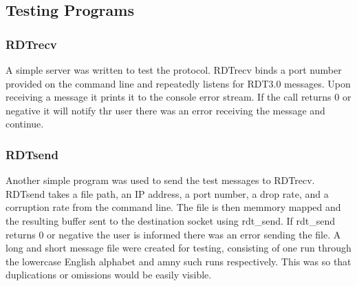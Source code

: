 \documentclass[11pt]{article}
\begin{document}
\subsection{Testing Programs}
\subsubsection{RDTrecv}
A simple server was written to test the protocol.  RDTrecv binds a port number provided on the command line and repeatedly listens for RDT3.0 messages.  Upon receiving a message it prints it to the console error stream. If the call returns 0 or negative it will notify thr user there was an error receiving the message and continue.
\subsubsection{RDTsend}
Another simple program was used to send the test messages to RDTrecv.  RDTsend takes a file path, an IP address, a port number, a drop rate, and a corruption rate from the command line.  The file is then memmory mapped and the resulting buffer sent to the destination socket using rdt\_send.  If rdt\_send returns 0 or negative the user is informed there was an error sending the file.  A long and short message file were created for testing, consisting of one run through the lowercase English alphabet and amny such runs respectively.  This was so that duplications or omissions would be easily visible.
\end{document}
